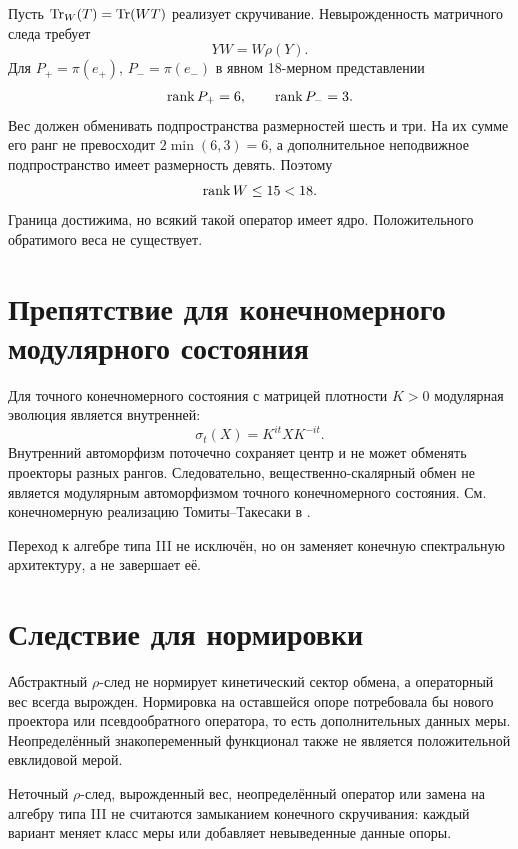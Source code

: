 Пусть \(\operatorname{Tr}_W(T)=\operatorname{Tr}(WT)\) реализует скручивание. Невырожденность
матричного следа требует
\begin{equation}
 YW=W\rho(Y).
 \label{eq:v5-weight-intertwiner}
\end{equation}
Для \(P_+=\pi(e_+)\), \(P_-=\pi(e_-)\) в явном 18-мерном представлении
\begin{equation}\operatorname{rank} P_+=6,\qquad\operatorname{rank} P_-=3.\end{equation}
Вес должен обменивать подпространства размерностей шесть и три. На их сумме
его ранг не превосходит \(2\min(6,3)=6\), а дополнительное неподвижное
подпространство имеет размерность девять. Поэтому
\begin{equation}\operatorname{rank} W\le15<18.\end{equation}
Граница достижима, но всякий такой оператор имеет ядро. Положительного
обратимого веса не существует.

\section{Препятствие для конечномерного модулярного состояния}

Для точного конечномерного состояния с матрицей плотности \(K>0\)
модулярная эволюция является внутренней:
\begin{equation}\sigma_t(X)=K^{it}XK^{-it}.\end{equation}
Внутренний автоморфизм поточечно сохраняет центр и не может обменять
проекторы разных рангов. Следовательно, вещественно-скалярный обмен не
является модулярным автоморфизмом точного конечномерного состояния. См.
конечномерную реализацию Томиты--Такесаки в .

Переход к алгебре типа III не исключён, но он заменяет конечную спектральную
архитектуру, а не завершает её.

\section{Следствие для нормировки}

Абстрактный \(\rho\)-след не нормирует кинетический сектор обмена, а
операторный вес всегда вырожден. Нормировка на оставшейся опоре потребовала
бы нового проектора или псевдообратного оператора, то есть дополнительных
данных меры. Неопределённый знакопеременный функционал также не является
положительной евклидовой мерой.

\begin{nogocriterion}
Неточный \(\rho\)-след, вырожденный вес, неопределённый оператор или замена
на алгебру типа III не считаются замыканием конечного скручивания: каждый
вариант меняет класс меры или добавляет невыведенные данные опоры.
\end{nogocriterion}

